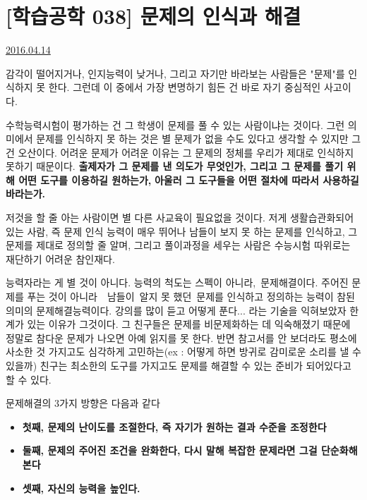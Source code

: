 \section{[학습공학 038] 문제의 인식과 해결}
\href{https://www.kockoc.com/Apoc/729341}{2016.04.14}

\vspace{5mm}

감각이 떨어지거나, 인지능력이 낮거나, 그리고 자기만 바라보는 사람들은 "문제"를 인식하지 못 한다.
그런데 이 중에서 가장 변명하기 힘든 건 바로 자기 중심적인 사고이다.
\vspace{5mm}

수학능력시험이 평가하는 건 그 학생이 문제를 풀 수 있는 사람이냐는 것이다.
그런 의미에서 문제를 인식하지 못 하는 것은 별 문제가 없을 수도 있다고 생각할 수 있지만 그건 오산이다.
어려운 문제가 어려운 이유는 그 문제의 정체를 우리가 제대로 인식하지 못하기 때문이다.
\textbf{출제자가 그 문제를 낸 의도가 무엇인가, 그리고 그 문제를 풀기 위해 어떤 도구를 이용하길 원하는가,}
\textbf{아울러 그 도구들을 어떤 절차에 따라서 사용하길 바라는가.}
\vspace{5mm}

저것을 할 줄 아는 사람이면 별 다른 사교육이 필요없을 것이다.
저게 생활습관화되어있는 사람, 즉 문제 인식 능력이 매우 뛰어나 남들이 보지 못 하는 문제를 인식하고,
그 문제를 제대로 정의할 줄 알며, 그리고 풀이과정을 세우는 사람은 수능시험 따위로는 재단하기 어려운 참인재다.
\vspace{5mm}

능력자라는 게 별 것이 아니다.
능력의 척도는 스펙이 아니라, 문제해결이다.
주어진 문제를 푸는 것이 아니라  남들이 알지 못 했던 문제를 인식하고 정의하는 능력이 참된 의미의 문제해결능력이다.
강의를 많이 듣고 어떻게 푼다... 라는 기술을 익혀보았자 한계가 있는 이유가 그것이다.
그 친구들은 문제를 비문제화하는 데 익숙해졌기 때문에 정말로 참다운 문제가 나오면 아예 읽지를 못 한다.
반면 참고서를 안 보더라도 평소에 사소한 것 가지고도 심각하게 고민하는(ex : 어떻게 하면 방귀로 감미로운 소리를 낼 수 있을까) 친구는
최소한의 도구를 가지고도 문제를 해결할 수 있는 준비가 되어있다고 할 수 있다.
\vspace{5mm}

문제해결의 3가지 방향은 다음과 같다
\begin{itemize}
    \item \textbf{첫째, 문제의 난이도를 조절한다, 즉 자기가 원하는 결과 수준을 조정한다}
    \item \textbf{둘째, 문제의 주어진 조건을 완화한다, 다시 말해 복잡한 문제라면 그걸 단순화해본다}
    \item \textbf{셋째, 자신의 능력을 높인다.}
\end{itemize}
\vspace{5mm}

